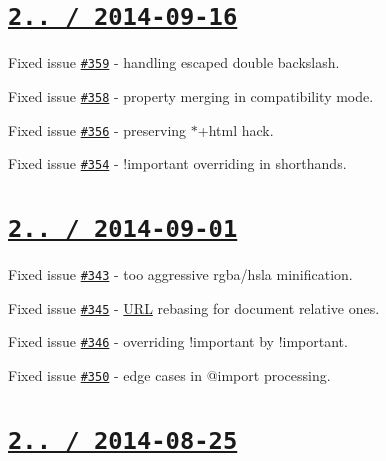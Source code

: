 \section*{\href{https://github.com/jakubpawlowicz/clean-css/compare/v2.2.15...v2.2.16}{\tt 2.. / 2014-\/09-\/16} }


\begin{DoxyItemize}
\item Fixed issue \href{https://github.com/jakubpawlowicz/clean-css/issues/359}{\tt \#359} -\/ handling escaped double backslash.
\item Fixed issue \href{https://github.com/jakubpawlowicz/clean-css/issues/358}{\tt \#358} -\/ property merging in compatibility mode.
\item Fixed issue \href{https://github.com/jakubpawlowicz/clean-css/issues/356}{\tt \#356} -\/ preserving {\ttfamily $\ast$+html} hack.
\item Fixed issue \href{https://github.com/jakubpawlowicz/clean-css/issues/354}{\tt \#354} -\/ {\ttfamily !important} overriding in shorthands.
\end{DoxyItemize}

\section*{\href{https://github.com/jakubpawlowicz/clean-css/compare/v2.2.14...v2.2.15}{\tt 2.. / 2014-\/09-\/01} }


\begin{DoxyItemize}
\item Fixed issue \href{https://github.com/jakubpawlowicz/clean-css/issues/343}{\tt \#343} -\/ too aggressive {\ttfamily rgba}/{\ttfamily hsla} minification.
\item Fixed issue \href{https://github.com/jakubpawlowicz/clean-css/issues/345}{\tt \#345} -\/ \mbox{\hyperlink{namespace_u_r_l}{U\+RL}} rebasing for document relative ones.
\item Fixed issue \href{https://github.com/jakubpawlowicz/clean-css/issues/346}{\tt \#346} -\/ overriding {\ttfamily !important} by {\ttfamily !important}.
\item Fixed issue \href{https://github.com/jakubpawlowicz/clean-css/issues/350}{\tt \#350} -\/ edge cases in {\ttfamily @import} processing.
\end{DoxyItemize}

\section*{\href{https://github.com/jakubpawlowicz/clean-css/compare/v2.2.13...v2.2.14}{\tt 2.. / 2014-\/08-\/25} }


